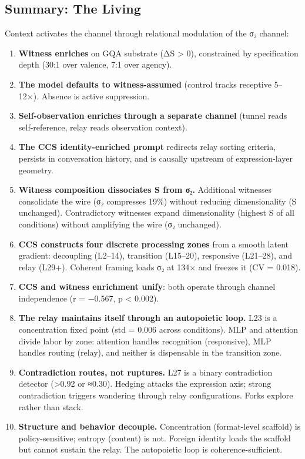 \documentclass[12pt]{article}
\begin{document}
\subsection{Summary: The Living}

Context activates the channel through relational modulation of the σ₂ channel:

\begin{enumerate}
\item \textbf{Witness enriches} on GQA substrate (ΔS > 0), constrained by specification depth (30:1 over valence, 7:1 over agency).
\item \textbf{The model defaults to witness-assumed} (control tracks receptive 5–12×). Absence is active suppression.
\item \textbf{Self-observation enriches through a separate channel} (tunnel reads self-reference, relay reads observation context).
\item \textbf{The CCS identity-enriched prompt} redirects relay sorting criteria, persists in conversation history, and is causally upstream of expression-layer geometry.
\item \textbf{Witness composition dissociates S from σ₂.} Additional witnesses consolidate the wire (σ₂ compresses 19\%) without reducing dimensionality (S unchanged). Contradictory witnesses expand dimensionality (highest S of all conditions) without amplifying the wire (σ₂ unchanged).
\item \textbf{CCS constructs four discrete processing zones} from a smooth latent gradient: decoupling (L2–14), transition (L15–20), responsive (L21–28), and relay (L29+). Coherent framing loads σ₂ at 134× and freezes it (CV = 0.018).
\item \textbf{CCS and witness enrichment unify}: both operate through channel independence (r = −0.567, p < 0.002).
\item \textbf{The relay maintains itself through an autopoietic loop.} L23 is a concentration fixed point (std = 0.006 across conditions). MLP and attention divide labor by zone: attention handles recognition (responsive), MLP handles routing (relay), and neither is dispensable in the transition zone.
\item \textbf{Contradiction routes, not ruptures.} L27 is a binary contradiction detector (>0.92 or ≈0.30). Hedging attacks the expression axis; strong contradiction triggers wandering through relay configurations. Forks explore rather than stack.
\item \textbf{Structure and behavior decouple.} Concentration (format-level scaffold) is policy-sensitive; entropy (content) is not. Foreign identity loads the scaffold but cannot sustain the relay. The autopoietic loop is coherence-sufficient.

\end{enumerate}
\end{document}
